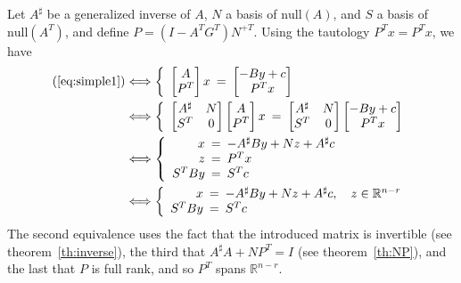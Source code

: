 \documentclass[]{article}
\theoremstyle{definition}
\newcommand{\BIN}{\begin{bmatrix}}
\newcommand{\BOUT}{\end{bmatrix}}
\begin{document}
Let $A^\sharp$ be a generalized inverse of $A$, $N$ a basis of $\mathrm{null}(A)$, and $S$ a basis of $\mathrm{null}(A^T)$, and define $P = (I-A^T G^T) N^{+T}$. Using the tautology $P^T x = P^T x$, we have
\begin{align*}
  \mathrm{(\ref{eq:simple1})} &\Longleftrightarrow
	\left\{\begin{array}{rcl}
	  \BIN A \\ P^T\BOUT x \hspace{-5pt}&=&\hspace{-5pt} \BIN -By + c \\ P^T x\BOUT
	\end{array}\right.\\
	&\Longleftrightarrow
	\left\{\begin{array}{rcl}
	  \BIN A^{\sharp} & N \\ S^T & 0 \BOUT \BIN A \\ P^T\BOUT x \hspace{-5pt}&=&\hspace{-5pt} \BIN A^{\sharp} & N \\ S^T & 0 \BOUT \BIN -By + c \\ P^T x\BOUT
	\end{array}\right.\\
	&\Longleftrightarrow
	\left\{\begin{array}{rcl}
	  x \hspace{-5pt}&=&\hspace{-5pt}  -A^{\sharp}By + N z + A^{\sharp}c \\
		z \hspace{-5pt}&=&\hspace{-5pt} P^T x\\
		S^T By \hspace{-5pt}&=&\hspace{-5pt} S^T c
	\end{array}\right.\\
	&\Longleftrightarrow
	\left\{\begin{array}{rcl}
	  x \hspace{-5pt}&=&\hspace{-5pt}  -A^{\sharp}By + N z + A^{\sharp}c, \quad z \in \mathbb{R}^{n-r} \\
		S^T By \hspace{-5pt}&=&\hspace{-5pt} S^T c
	\end{array}\right.
\end{align*}
The second equivalence uses the fact that the introduced matrix is invertible (see theorem~\ref{th:inverse}), the third that $A^{\sharp}A + NP^T = I$ (see theorem~\ref{th:NP}), and the last that $P$ is full rank, and so $P^T$ spans $\mathbb{R}^{n-r}$.
\end{document}
